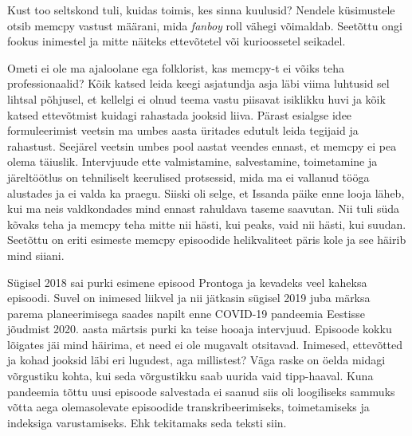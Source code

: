 Kust too seltskond tuli, kuidas toimis, kes sinna kuulusid? Nendele küsimustele 
otsib memcpy vastust määrani, mida \emph{fanboy} roll vähegi võimaldab. Seetõttu ongi 
fookus inimestel ja mitte näiteks ettevõtetel 
või kurioossetel seikadel. 

Ometi ei ole ma ajaloolane ega folklorist, kas memcpy-t ei võiks teha 
professionaalid? Kõik katsed leida keegi asjatundja asja läbi viima luhtusid 
sel lihtsal põhjusel, et kellelgi ei olnud teema vastu piisavat isiklikku huvi 
ja kõik katsed ettevõtmist kuidagi rahastada jooksid liiva. Pärast esialgse 
idee formuleerimist veetsin ma umbes aasta üritades edutult leida tegijaid ja 
rahastust. Seejärel veetsin umbes pool aastat veendes ennast, et memcpy ei pea 
olema täiuslik. Intervjuude ette valmistamine, salvestamine, toimetamine ja 
järeltöötlus on tehniliselt keerulised protsessid, mida ma ei vallanud tööga alustades ja 
ei valda ka praegu. Siiski oli selge, et Issanda päike enne looja läheb, kui ma 
neis valdkondades mind ennast rahuldava taseme saavutan. Nii tuli süda kõvaks teha ja memcpy teha
mitte nii hästi, kui peaks, vaid nii hästi, kui suudan. Seetõttu on 
eriti esimeste memcpy episoodide helikvaliteet päris kole ja see häirib mind 
siiani.

Sügisel 2018 sai purki esimene episood Prontoga ja 
kevadeks veel kaheksa episoodi. Suvel on inimesed liikvel ja nii jätkasin 
sügisel 2019 juba märksa parema planeerimisega saades napilt enne COVID-19 
pandeemia Eestisse jõudmist 2020. aasta märtsis purki ka teise hooaja 
intervjuud. Episoode kokku lõigates jäi mind häirima, et need ei ole mugavalt 
otsitavad. Inimesed, ettevõtted ja kohad jooksid läbi eri lugudest, aga 
millistest? Väga raske on öelda midagi võrgustiku kohta, kui seda võrgustikku 
saab uurida vaid tipp-haaval. Kuna pandeemia tõttu uusi episoode salvestada ei 
saanud siis oli loogiliseks sammuks võtta aega olemasolevate episoodide 
transkribeerimiseks, toimetamiseks ja indeksiga varustamiseks. Ehk tekitamaks 
seda teksti siin. 

